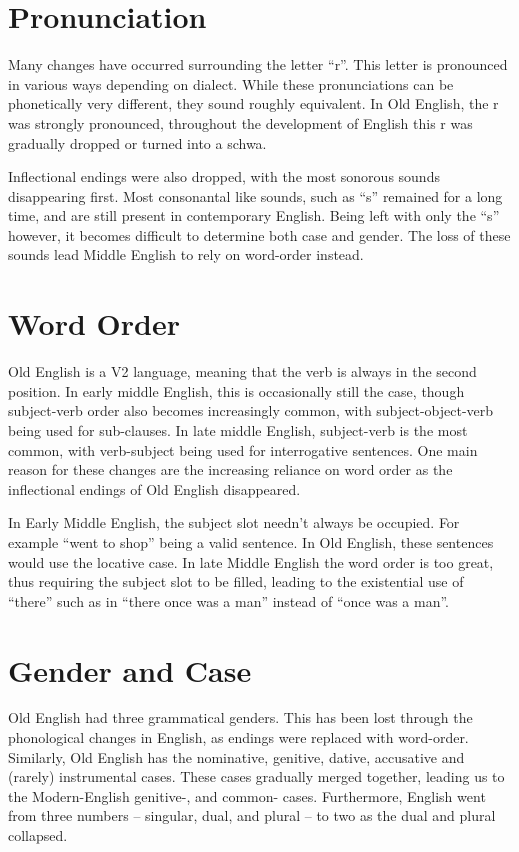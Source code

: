 \documentclass[12pt]{report}
\begin{document}
\section{Pronunciation}

Many changes have occurred surrounding the letter ``r''. This letter is
pronounced in various ways depending on dialect. While these pronunciations
can be phonetically very different, they sound roughly equivalent. In Old
English, the r was strongly pronounced, throughout the development of English
this r was gradually dropped or turned into a schwa.

Inflectional endings were also dropped, with the most sonorous sounds
disappearing first. Most consonantal like sounds, such as ``s'' remained for a
long time, and are still present in contemporary English. Being left with only
the ``s'' however, it becomes difficult to determine both case and gender. The
loss of these sounds lead Middle English to rely on word-order instead.

\section{Word Order}

Old English is a V2 language, meaning that the verb is always in the second
position. In early middle English, this is occasionally still the case, though
subject-verb order also becomes increasingly common, with subject-object-verb
being used for sub-clauses. In late middle English, subject-verb is the most
common, with verb-subject being used for interrogative sentences. One main
reason for these changes are the increasing reliance on word order as the
inflectional endings of Old English disappeared.

In Early Middle English, the subject slot needn't always be occupied. For
example ``went to shop'' being a valid sentence. In Old English, these sentences
would use the locative case. In late Middle English the word order is too great,
thus requiring the subject slot to be filled, leading to the existential use of
``there'' such as in ``there once was a man'' instead of ``once was a man''. 

\section{Gender and Case}

Old English had three grammatical genders. This has been lost through the
phonological changes in English, as endings were replaced with word-order.
Similarly, Old English has the nominative, genitive, dative, accusative and
(rarely) instrumental cases. These cases gradually merged together, leading us
to the Modern-English genitive-, and common- cases. Furthermore, English went
from three numbers -- singular, dual, and plural -- to two as the dual and
plural collapsed.
\end{document}

